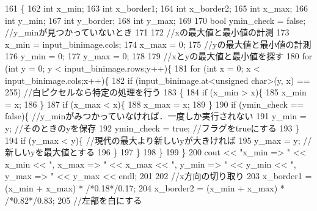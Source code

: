 \begin{DoxyCode}
161 \{
162     \textcolor{keywordtype}{int} x\_min;
163     \textcolor{keywordtype}{int} x\_border1;
164     \textcolor{keywordtype}{int} x\_border2;
165     \textcolor{keywordtype}{int} x\_max;
166     \textcolor{keywordtype}{int} y\_min;
167     \textcolor{keywordtype}{int} y\_border;
168     \textcolor{keywordtype}{int} y\_max;
169 
170     \textcolor{keywordtype}{bool} ymin\_check = \textcolor{keyword}{false}; \textcolor{comment}{//y\_minが見つかっていないとき}
171 
172     \textcolor{comment}{//xの最大値と最小値の計測}
173     x\_min = input\_binimage.cols;
174     x\_max = 0;
175     \textcolor{comment}{//yの最大値と最小値の計測}
176     y\_min = 0;
177     y\_max = 0;
178 
179     \textcolor{comment}{//xとyの最大値と最小値を探す}
180     \textcolor{keywordflow}{for} (\textcolor{keywordtype}{int} y = 0; y < input\_binimage.rows;y++)\{
181         \textcolor{keywordflow}{for} (\textcolor{keywordtype}{int} x = 0; x < input\_binimage.cols;x++)\{
182             \textcolor{keywordflow}{if} (input\_binimage.at<\textcolor{keywordtype}{unsigned} \textcolor{keywordtype}{char}>(y, x) == 255) \textcolor{comment}{//白ピクセルなら特定の処理を行う}
183             \{
184                 \textcolor{keywordflow}{if} (x\_min > x)\{
185                     x\_min = x;
186                 \}
187                 \textcolor{keywordflow}{if} (x\_max < x)\{
188                     x\_max = x;
189                 \}
190                 \textcolor{keywordflow}{if} (ymin\_check == \textcolor{keyword}{false})\{ \textcolor{comment}{//y\_minがみつかっていなければ．一度しか実行されない}
191                     y\_min = y; \textcolor{comment}{//そのときのyを保存}
192                     ymin\_check = \textcolor{keyword}{true}; \textcolor{comment}{//フラグをtrueにする}
193                 \}
194                 \textcolor{keywordflow}{if} (y\_max < y)\{ \textcolor{comment}{//現代の最大より新しいyが大きければ}
195                     y\_max = y; \textcolor{comment}{//新しいyを最大値とする}
196                 \}
197             \}
198         \}
199     \}
200     cout << \textcolor{stringliteral}{"x\_min => "} << x\_min << \textcolor{stringliteral}{", x\_max => "} << x\_max << \textcolor{stringliteral}{", y\_min => "} << y\_min << \textcolor{stringliteral}{", y\_max => "} << 
      y\_max << endl;
201 
202     \textcolor{comment}{//x方向の切り取り}
203     x\_border1 = (x\_min + x\_max) * \textcolor{comment}{/*0.18*/}0.17;
204     x\_border2 = (x\_min + x\_max) * \textcolor{comment}{/*0.82*/}0.83;
205     \textcolor{comment}{//左部を白にする}

\end{DoxyCode}

